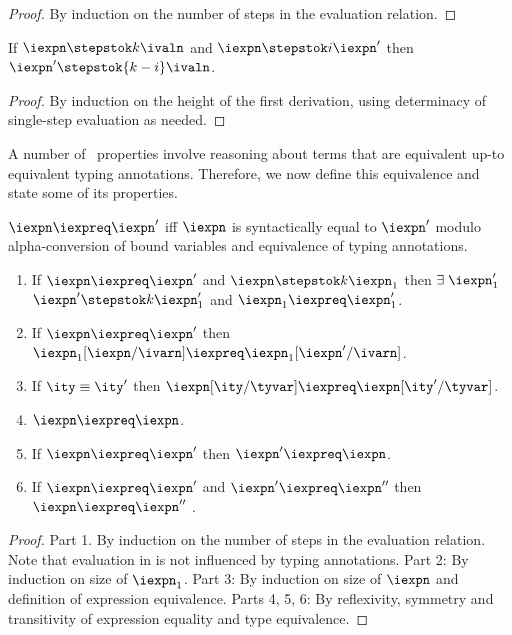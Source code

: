 \begin{proof}
  By induction on the number of steps in the evaluation relation.
\end{proof}

\begin{lemma}
  If $\iexpn \stepstok k \ivaln$ and $\iexpn \stepstok i \iexpn'$ then
  $\iexpn' \stepstok {k-i} \ivaln$.
  \label{lemma:eval-unique}
\end{lemma}

\begin{proof}
  By induction on the height of the first derivation, using
  determinacy of single-step evaluation as needed.
\end{proof}

A number of \ddc\ properties
involve reasoning about terms that are equivalent up-to equivalent
typing annotations. Therefore, we now define this equivalence and state
some of its properties.

\begin{definition}
  $\iexpn \iexpreq \iexpn'$ iff $\iexpn$ is syntactically equal to
  $\iexpn'$ modulo alpha-conversion of bound variables and equivalence
  of typing annotations.
\label{def:op-eq}  
\end{definition}

\begin{lemma}
  \begin{enumerate}
  \item If $\iexpn \iexpreq \iexpn'$ and $\iexpn \stepstok k \iexpn_1$ then
    $\exists\;\iexpn_1'$ \suchthat{}
    $\iexpn' \stepstok k \iexpn_1'$ and $\iexpn_1 \iexpreq \iexpn_1'$.
  \item If $\iexpn \iexpreq \iexpn'$ then 
    $\iexpn_1[\iexpn/\ivarn] \iexpreq \iexpn_1[\iexpn'/\ivarn]$.
  \item If $\ity \equiv \ity'$ then 
    $\iexpn[\ity/\tyvar] \iexpreq \iexpn[\ity'/\tyvar]$.
  \item $\iexpn \iexpreq \iexpn$.
  \item If $\iexpn \iexpreq \iexpn'$ then $\iexpn' \iexpreq \iexpn$. 
  \item If $\iexpn \iexpreq \iexpn'$ and $\iexpn' \iexpreq \iexpn''$  then
    $\iexpn \iexpreq \iexpn''$ .
  \end{enumerate}
\label{lemma:misc-synt-eq}
\end{lemma}

\begin{proof}
  Part 1. By induction on the number of steps in the evaluation relation.
  Note that evaluation in \fomega{} is not influenced by typing
  annotations. Part 2: By induction on size of $\iexpn_1$. Part 3: By
  induction on size of $\iexpn$ and definition of expression
  equivalence. Parts 4, 5, 6: By reflexivity, symmetry and transitivity
  of expression equality and type equivalence.
\end{proof}

